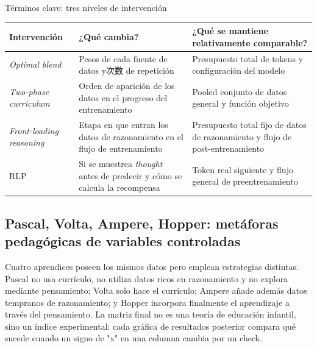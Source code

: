 \begin{knowledgebox}{Términos clave: tres niveles de intervención}
\begin{tabularx}{\textwidth}{L{0.22\textwidth}X X}
\toprule
Intervención & ¿Qué cambia? & ¿Qué se mantiene relativamente comparable? \\
\midrule
\textit{Optimal blend} & Pesos de cada fuente de datos y次数 de repetición & Presupuesto total de tokens y configuración del modelo \\
\textit{Two-phase curriculum} & Orden de aparición de los datos en el progreso del entrenamiento & Pooled conjunto de datos general y función objetivo \\
\textit{Front-loading reasoning} & Etapa en que entran los datos de razonamiento en el flujo de entrenamiento & Presupuesto total fijo de datos de razonamiento y flujo de post-entrenamiento \\
RLP & Si se muestrea \textit{thought} antes de predecir y cómo se calcula la recompensa & Token real siguiente y flujo general de preentrenamiento \\
\bottomrule
\end{tabularx}
\end{knowledgebox}

\subsection{Pascal, Volta, Ampere, Hopper: metáforas pedagógicas de variables controladas}

Cuatro aprendices poseen los mismos datos pero emplean estrategias distintas. Pascal no usa currículo, no utiliza datos ricos en razonamiento y no explora mediante pensamiento; Volta solo hace el currículo; Ampere añade además datos tempranos de razonamiento; y Hopper incorpora finalmente el aprendizaje a través del pensamiento. La matriz final no es una teoría de educación infantil, sino un índice experimental: cada gráfica de resultados posterior compara qué sucede cuando un signo de "x" en una columna cambia por un check.



